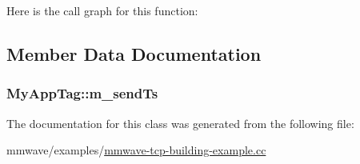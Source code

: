 Here is the call graph for this function\+:




\subsection{Member Data Documentation}
\subsubsection[{\texorpdfstring{m\+\_\+send\+Ts}{m_sendTs}}]{ My\+App\+Tag\+::m\+\_\+send\+Ts}\hypertarget{classMyAppTag_a0ae9e3aa73845754488992d598c55ea8}{}\label{classMyAppTag_a0ae9e3aa73845754488992d598c55ea8}


The documentation for this class was generated from the following file\+:\begin{DoxyCompactItemize}
\item 
mmwave/examples/\hyperlink{mmwave-tcp-building-example_8cc}{mmwave-\/tcp-\/building-\/example.\+cc}\end{DoxyCompactItemize}
